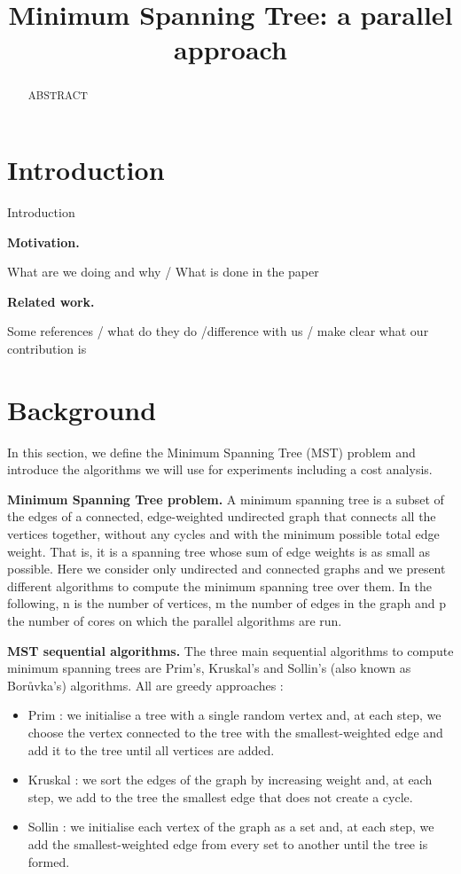 \documentclass[letterpaper]{article}
\title{Minimum Spanning Tree: a parallel approach}
\newcommand{\mypar}[1]{{\bf #1.}}
\begin{document}
%
\maketitle
%


\begin{abstract}

ABSTRACT

\end{abstract}

\section{Introduction}\label{sec:intro}

Introduction

\mypar{Motivation} 

What are we doing and why / What is done in the paper

\mypar{Related work} 

Some references / what do they do /difference with us / make clear what our contribution is

\section{Background}\label{sec:background}

In this section, we define the Minimum Spanning Tree (MST) problem and introduce the algorithms we will use for experiments including a cost analysis.

\mypar{Minimum Spanning Tree problem}
A minimum spanning tree is a subset of the edges of a connected, edge-weighted undirected graph that connects all the vertices together, without any cycles and with the minimum possible total edge weight. That is, it is a spanning tree whose sum of edge weights is as small as possible. Here we consider only undirected and connected graphs and we present different algorithms to compute the minimum spanning tree over them. In the following, n is the number of vertices, m the number of edges in the graph and p the number of cores on which the parallel algorithms are run.

\mypar{MST sequential algorithms} The three main sequential algorithms to compute minimum spanning trees are Prim's, Kruskal's and Sollin's (also known as Borůvka's)  algorithms. All are greedy approaches :
\begin{itemize}
    \item Prim : we initialise a tree with a single random vertex and, at each step, we choose the vertex connected to the tree with the smallest-weighted edge and add it to the tree until all vertices are added.
    \item Kruskal : we sort the edges of the graph by increasing weight and, at each step, we add to the tree the smallest edge that does not create a cycle.
    \item Sollin : we initialise each vertex of the graph as a set and, at each step, we add the smallest-weighted edge from every set to another until the tree is formed.
\end{itemize}
\end{document}

